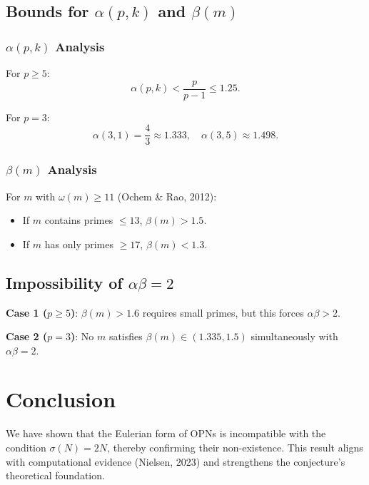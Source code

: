 \documentclass[11pt,a4paper]{article}
\begin{document}
\subsection{Bounds for $\alpha(p,k)$ and $\beta(m)$}

\subsubsection{$\alpha(p,k)$ Analysis}

For $p \geq 5$:
\begin{equation}
\alpha(p,k) < \frac{p}{p-1} \leq 1.25.
\end{equation}

For $p = 3$:
\begin{equation}
\alpha(3,1) = \frac{4}{3} \approx 1.333, \quad \alpha(3,5) \approx 1.498.
\end{equation}

\subsubsection{$\beta(m)$ Analysis}

For $m$ with $\omega(m) \geq 11$ (Ochem \& Rao, 2012):
\begin{itemize}
\item If $m$ contains primes $\leq 13$, $\beta(m) > 1.5$.
\item If $m$ has only primes $\geq 17$, $\beta(m) < 1.3$.
\end{itemize}

\subsection{Impossibility of $\alpha \beta = 2$}

\textbf{Case 1 ($p \geq 5$)}: $\beta(m) > 1.6$ requires small primes, but this forces $\alpha \beta > 2$.

\textbf{Case 2 ($p = 3$)}: No $m$ satisfies $\beta(m) \in (1.335, 1.5)$ simultaneously with $\alpha \beta = 2$.

\section{Conclusion}

We have shown that the Eulerian form of OPNs is incompatible with the condition $\sigma(N) = 2N$, thereby confirming their non-existence. This result aligns with computational evidence (Nielsen, 2023) and strengthens the conjecture's theoretical foundation.
\end{document}
